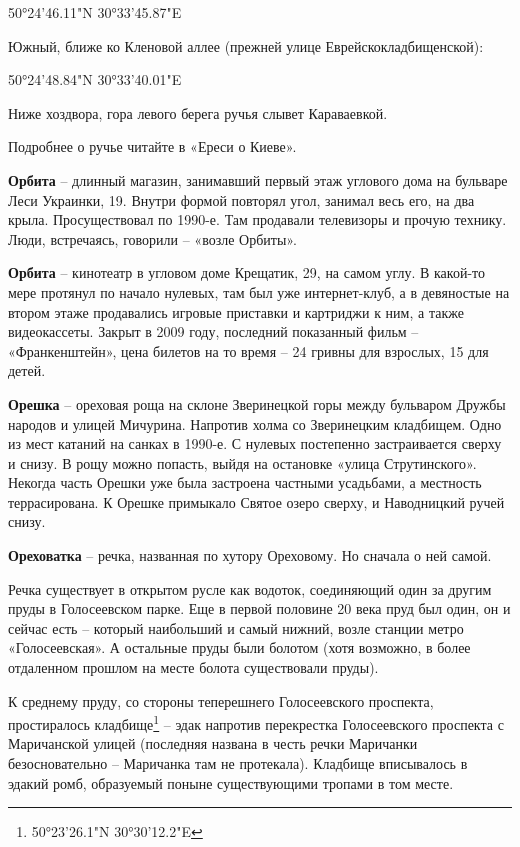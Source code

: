50°24'46.11"N 30°33'45.87"E

Южный, ближе ко Кленовой аллее (прежней улице Еврейскокладбищенской):

50°24'48.84"N 30°33'40.01"E

Ниже хоздвора, гора левого берега ручья слывет Караваевкой.

Подробнее о ручье читайте в «Ереси о Киеве».\\

\medskip

\textbf{Орбита} – длинный магазин, занимавший первый этаж углового дома на бульваре Леси Украинки, 19. Внутри формой повторял угол, занимал весь его, на два крыла. Просуществовал по 1990-е. Там продавали телевизоры и прочую технику. Люди, встречаясь, говорили – «возле Орбиты».\\

\medskip

\textbf{Орбита} – кинотеатр в угловом доме Крещатик, 29, на самом углу. В какой-то мере протянул по начало нулевых, там был уже интернет-клуб, а в девяностые на втором этаже продавались игровые приставки и картриджи к ним, а также видеокассеты. Закрыт в 2009 году, последний показанный фильм – «Франкенштейн», цена билетов на то время – 24 гривны для взрослых, 15 для детей.\\

\medskip

\textbf{Орешка} – ореховая роща на склоне Зверинецкой горы между бульваром Дружбы народов и улицей Мичурина. Напротив холма со Зверинецким кладбищем. Одно из мест катаний на санках в 1990-е. С нулевых постепенно застраивается сверху и снизу. В рощу можно попасть, выйдя на остановке «улица Струтинского». Некогда часть Орешки уже была застроена частными усадьбами, а местность террасирована. К Орешке примыкало Святое озеро сверху, и Наводницкий ручей снизу.\\

\medskip

\textbf{Ореховатка} – речка, названная по хутору Ореховому. Но сначала о ней самой.

Речка существует в открытом русле как водоток, соединяющий один за другим пруды в Голосеевском парке. Еще в первой половине 20 века пруд был один, он и сейчас есть – который наибольший и самый нижний, возле станции метро «Голосеевская». А остальные пруды были болотом (хотя возможно, в более отдаленном прошлом на месте болота существовали пруды).

К среднему пруду, со стороны теперешнего Голосеевского проспекта, простиралось кладбище\footnote{50°23'26.1"N 30°30'12.2"E} – эдак напротив перекрестка Голосеевского проспекта с Маричанской улицей (последняя названа в честь речки Маричанки безосновательно – Маричанка там не протекала). Кладбище вписывалось в эдакий ромб, образуемый поныне существующими тропами в том месте.

